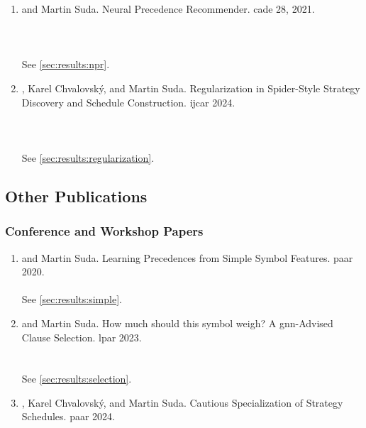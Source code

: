 \begin{enumerate}

\item {} and Martin Suda.
Neural Precedence Recommender.
\Gls{cade} 28, 2021.
\cite{DBLP:conf/cade/Bartek021}
\\ 
\\ 
\\ 
\\ See \cref{sec:results:npr}.

\item {}, Karel Chvalovský, and Martin Suda. Regularization in Spider-Style Strategy Discovery and Schedule Construction. \Gls{ijcar} 2024. \cite{DBLP:conf/ijcar/BartekCS24}
\\ 
\\ 
\\ 
\\ See \cref{sec:results:regularization}.

\end{enumerate}

\subsection{Other Publications}

\subsubsection{Conference and Workshop Papers}

\begin{enumerate}

\item {} and Martin Suda. Learning Precedences from Simple Symbol Features. \Gls{paar} 2020. \cite{DBLP:conf/cade/Bartek020}
\\ 
\\ See \cref{sec:results:simple}.

\item {} and Martin Suda. How much should this symbol weigh? A \acrshort{gnn}-Advised Clause Selection. \Gls{lpar} 2023. \cite{DBLP:conf/lpar/Bartek023}
\\ 
\\ 
\\ See \cref{sec:results:selection}.

\item {}, Karel Chvalovský, and Martin Suda. Cautious Specialization of Strategy Schedules. \Gls{paar} 2024. \cite{DBLP:conf/paar/BartekC024}

\end{enumerate}

